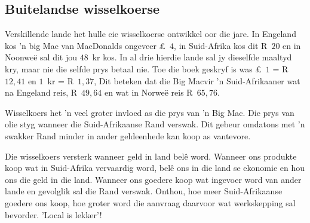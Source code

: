 \subsection{Buitelandse wisselkoerse}

Verskillende lande het hulle eie wisselkoerse ontwikkel oor die jare. In Engeland kos 'n big Mac van MacDonalds ongeveer £~$4$, in Suid-Afrika kos dit R~$20$ en in Noonwe\"e sal dit jou $48$~kr kos. In al drie hierdie lande sal jy dieselfde maaltyd kry, maar nie die selfde prys betaal nie. Toe die boek geskryf is was £~$1$ = R~$12,41$ en $1$~kr = R~$1,37$, Dit beteken dat die Big Macvir 'n Suid-Afrikaaner wat na Engeland reis, R~$49,64$ en wat in Norwe\"e reis R~$65,76$.\par

Wisselkoers het 'n veel groter invloed as die prys van 'n Big Mac. Die prys van olie styg wanneer die Suid-Afrikaanse Rand verswak. Dit gebeur omdatons met 'n swakker Rand minder in ander geldeenhede kan koop as vantevore.\par

Die wisselkoers versterk wanneer geld in land bel\^e word. Wanneer ons produkte koop wat in Suid-Afrika vervaardig word, bel\^e ons in die land se ekonomie en hou ons die geld in die land. Wanneer ons goedere koop wat ingevoer word van ander lande en gevolglik sal die Rand verswak. Onthou, hoe meer Suid-Afrikaanse goedere ons koop, hoe groter word die aanvraag daarvoor wat werkskepping sal bevorder. 'Local is lekker'!


\begin{wex}{Buitelandse Wisselkoerse}
    {Saba wil oorsee gaan om familie in Spanje te besoek. Sy het R~$10~000$ beskikbaar om te spandeer, Hoeveel Euros kan sy daarvoor koop as die wisselkoers tans €~$1$ = R~$10,68$?}{
    
    Sy kan €~$936,33$ koop met R~$10~000$.
\end{wex}


